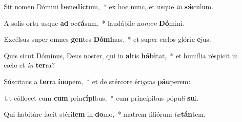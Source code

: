 \item Sit nomen Dómini \textbf{be}ne\textbf{díc}tum,~* ex hoc nunc, et usque \textit{in} \textbf{sǽ}culum.
\item A solis ortu usque \textbf{ad} oc\textbf{cá}sum,~* laudábile no\textit{men} \textbf{Dó}mini.
\item Excélsus super omnes \textbf{gen}tes \textbf{Dó}\textbf{mi}nus,~* et super cælos glóri\textit{a} \textbf{e}jus.
\item Quis sicut Dóminus, Deus noster, qui in \textbf{al}tis \textbf{há}\textbf{bi}tat,~* et humília réspicit in cælo et \textit{in} \textbf{ter}ra?
\item Súscitans a \textbf{ter}ra \textbf{ín}\textbf{o}pem,~* et de stércore éri\textit{gens} \textbf{páu}perem:
\item Ut cóllocet eum \textbf{cum} prin\textbf{cí}\textbf{pi}bus,~* cum princípibus pópu\textit{li} \textbf{su}i.
\item Qui habitáre facit stéri\textbf{lem} in \textbf{do}mo,~* matrem filiórum \textit{læ}\textbf{tán}tem.

